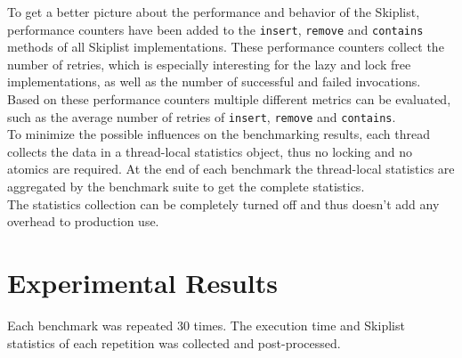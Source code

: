 To get a better picture about the performance and behavior of the Skiplist, performance counters have been added to the \texttt{insert}, \texttt{remove} and \texttt{contains} methods of all Skiplist implementations. These performance counters collect the number of retries, which is especially interesting for the lazy and lock free implementations, as well as the number of successful and failed invocations. Based on these performance counters multiple different metrics can be evaluated, such as the average number of retries of \texttt{insert}, \texttt{remove} and \texttt{contains}.\\

\noindent To minimize the possible influences on the benchmarking results, each thread collects the data in a thread-local statistics object, thus no locking and no atomics are required. At the end of each benchmark the thread-local statistics are aggregated by the benchmark suite to get the complete statistics.\\

\noindent The statistics collection can be completely turned off and thus doesn't add any overhead to production use.

\section{Experimental Results}

Each benchmark was repeated $30$ times. The execution time and Skiplist statistics of each repetition was collected and post-processed.
